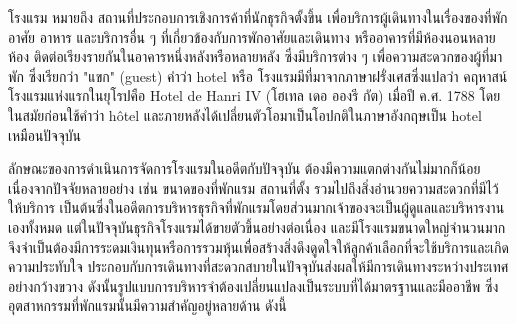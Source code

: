\documentclass{report}
\begin{document}
\hspace{1cm}โรงแรม หมายถึง สถานที่ประกอบการเชิงการค้าที่นักธุรกิจตั้งขึ้น เพื่อบริการผู้เดินทางในเรื่องของที่พักอาศัย อาหาร และบริการอื่น ๆ ที่เกี่ยวข้องกับการพักอาศัยและเดินทาง หรืออาคารที่มีห้องนอนหลายห้อง ติดต่อเรียงรายกันในอาคารหนึ่งหลังหรือหลายหลัง ซึ่งมีบริการต่าง ๆ เพื่อความสะดวกของผู้ที่มาพัก ซึ่งเรียกว่า "แขก" (guest)
\hspace{1cm}คำว่า hotel หรือ โรงแรมมีที่มาจากภาษาฝรั่งเศสซึ่งแปลว่า คฤหาสน์ โรงแรมแห่งแรกในยุโรปคือ Hotel de Hanri IV (โฮเทล เดอ อองรี กัต) เมื่อปี ค.ศ. 1788 โดยในสมัยก่อนใช้คำว่า hôtel และภายหลังได้เปลี่ยนตัวโอมาเป็นโอปกติในภาษาอังกฤษเป็น hotel เหมือนปัจจุบัน\cite{history}

\hspace{1cm}ลักษณะของการดำเนินการจัดการโรงแรมในอดีตกับปัจจุบัน ต้องมีความแตกต่างกันไม่มากก็น้อย เนื่องจากปัจจัยหลายอย่าง เช่น ขนาดของที่พักแรม สถานที่ตั้ง รวมไปถึงสิ่งอำนวยความสะดวกที่มีไว้ให้บริการ เป็นต้นซึ่งในอดีตการบริหารธุรกิจที่พักแรมโดยส่วนมากเจ้าของจะเป็นผู้ดูแลและบริหารงานเองทั้งหมด แต่ในปัจจุบันธุรกิจโรงแรมได้ขายตัวขึ้นอย่างต่อเนื่อง และมีโรงแรมขนาดใหญ่จำนวนมาก จึงจำเป็นต้องมีการระดมเงินทุนหรือการรวมหุ้นเพื่อสร้างสิ่งดึงดูดใจให้ลูกค้าเลือกที่จะใช้บริการและเกิดความประทับใจ ประกอบกับการเดินทางที่สะดวกสบายในปัจจุบันส่งผลให้มีการเดินทางระหว่างประเทศอย่างกว้างขวาง ดังนั้นรูปแบบการบริหารจำต้องเปลี่ยนแปลงเป็นระบบที่ได้มาตรฐานและมืออาชีพ  ซึ่งอุตสาหกรรมที่พักแรมนั้นมีความสำคัญอยู่หลายด้าน ดังนี้ 
\end{document}
